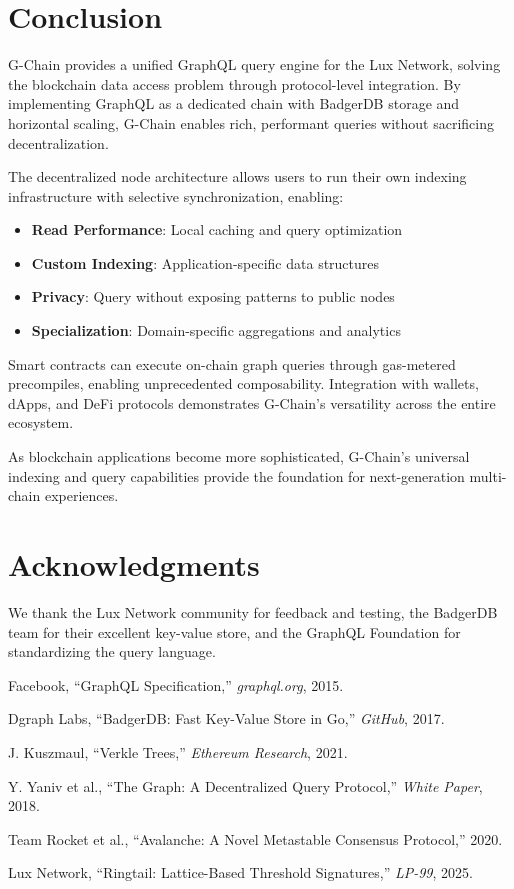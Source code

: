\documentclass[11pt,a4paper]{article}
\begin{document}
\section{Conclusion}

G-Chain provides a unified GraphQL query engine for the Lux Network, solving the blockchain data access problem through protocol-level integration. By implementing GraphQL as a dedicated chain with BadgerDB storage and horizontal scaling, G-Chain enables rich, performant queries without sacrificing decentralization.

The decentralized node architecture allows users to run their own indexing infrastructure with selective synchronization, enabling:
\begin{itemize}
\item \textbf{Read Performance}: Local caching and query optimization
\item \textbf{Custom Indexing}: Application-specific data structures
\item \textbf{Privacy}: Query without exposing patterns to public nodes
\item \textbf{Specialization}: Domain-specific aggregations and analytics
\end{itemize}

Smart contracts can execute on-chain graph queries through gas-metered precompiles, enabling unprecedented composability. Integration with wallets, dApps, and DeFi protocols demonstrates G-Chain's versatility across the entire ecosystem.

As blockchain applications become more sophisticated, G-Chain's universal indexing and query capabilities provide the foundation for next-generation multi-chain experiences.

\section*{Acknowledgments}

We thank the Lux Network community for feedback and testing, the BadgerDB team for their excellent key-value store, and the GraphQL Foundation for standardizing the query language.


\begin{thebibliography}{99}

Facebook, ``GraphQL Specification,'' \textit{graphql.org}, 2015.

Dgraph Labs, ``BadgerDB: Fast Key-Value Store in Go,'' \textit{GitHub}, 2017.

J. Kuszmaul, ``Verkle Trees,'' \textit{Ethereum Research}, 2021.

Y. Yaniv et al., ``The Graph: A Decentralized Query Protocol,'' \textit{White Paper}, 2018.

Team Rocket et al., ``Avalanche: A Novel Metastable Consensus Protocol,'' 2020.

Lux Network, ``Ringtail: Lattice-Based Threshold Signatures,'' \textit{LP-99}, 2025.

\end{thebibliography}
\end{document}
